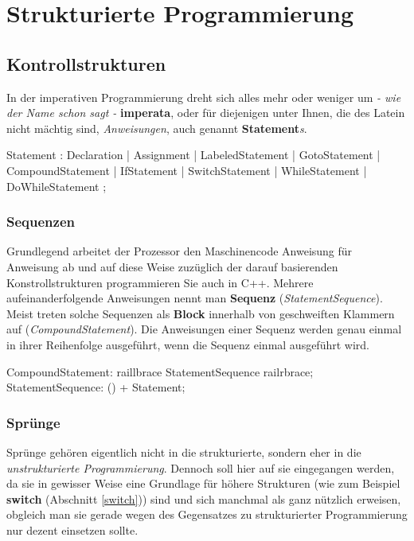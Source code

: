 \documentclass[a4paper]{report}
\begin{document}
\chapter{Strukturierte Programmierung}
\section{Kontrollstrukturen}

In der imperativen Programmierung dreht sich alles mehr oder weniger um \textit{- wie der Name schon sagt -} \textbf{imperata}, oder für diejenigen unter Ihnen, die des Latein nicht mächtig sind, \textit{Anweisungen}, auch genannt \textbf{Statement}\textit{s}.

\begin{rail}
	Statement : Declaration |%
				Assignment |
				LabeledStatement |
				GotoStatement |
				CompoundStatement |
				IfStatement |
				SwitchStatement |
				WhileStatement |
				DoWhileStatement
				;
				
\end{rail}

\subsection{Sequenzen}
Grundlegend arbeitet der Prozessor den Maschinencode Anweisung für Anweisung ab und auf diese Weise zuzüglich der darauf basierenden Konstrollstrukturen programmieren Sie auch in C++. Mehrere aufeinanderfolgende Anweisungen nennt man \textbf{Sequenz} (\textit{StatementSequence}). Meist treten solche Sequenzen als \textbf{Block} innerhalb von geschweiften Klammern auf (\textit{CompoundStatement}). Die Anweisungen einer Sequenz werden genau einmal in ihrer Reihenfolge ausgeführt, wenn die Sequenz einmal ausgeführt wird.
\begin{rail}
	CompoundStatement: raillbrace StatementSequence railrbrace;
	StatementSequence:	() + Statement;	
\end{rail}
\subsection{Sprünge}
Sprünge gehören eigentlich nicht in die strukturierte, sondern eher in die \textit{unstrukturierte Programmierung}. Dennoch soll hier auf sie eingegangen werden, da sie in gewisser Weise eine Grundlage für höhere Strukturen (wie zum Beispiel \textbf{switch} (Abschnitt \ref{switch})) sind und sich manchmal als ganz nützlich erweisen, obgleich man sie gerade wegen des Gegensatzes zu strukturierter Programmierung nur dezent einsetzen sollte. 
\end{document}
